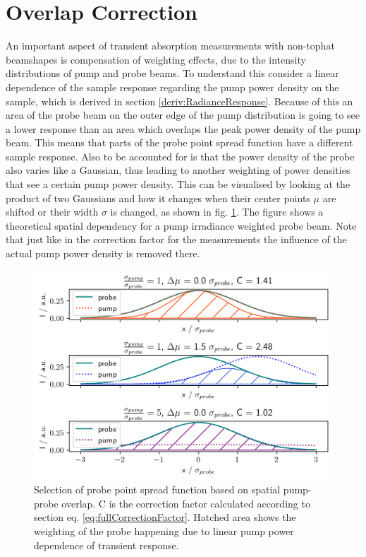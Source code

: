 \documentclass[twoside,openright]{scrreprt}
\begin{document}
\section{Overlap Correction}\label{sec:overlapCorrDescription}
An important aspect of transient absorption measurements with non-tophat beamshapes is compensation of weighting effects, due to the intensity distributions of pump and probe beams. To understand this consider a linear dependence of the sample response regarding the pump power density on the sample, which is derived in section \ref{deriv:RadianceResponse}. Because of this an area of the probe beam on the outer edge of the pump distribution is going to see a lower response than an area which overlaps the peak power density of the pump beam. This means that parts of the probe point spread function have a different sample response. Also to be accounted for is that the power density of the probe also varies like a Gaussian, thus leading to another weighting of power densities that see a certain pump power density.
This can be visualised by looking at the product of two Gaussians and how it changes when their center points $\mu$ are shifted or their width $\sigma$ is changed, as shown in fig. \ref{fig:overlapVisualisation}. The figure shows a theoretical spatial dependency for a pump irradiance weighted probe beam. Note that just like in the correction factor for the measurements the influence of the actual pump power density is removed there.

\begin{figure}[!hb]
\centering
\includegraphics[scale=1]{images/OverlapVisualisationProbeSelection.png}
\caption{Selection of probe point spread function based on spatial pump-probe overlap. C is the correction factor calculated according to section eq. \ref{eq:fullCorrectionFactor}. Hatched area shows the weighting of the probe happening due to linear pump power dependence of transient response.\label{fig:overlapVisualisation}}
\end{figure}
\end{document}
